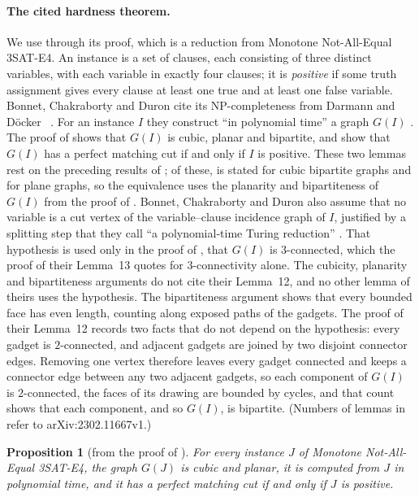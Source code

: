 \documentclass[11pt]{article}
\newtheorem{proposition}[theorem]{Proposition}
\theoremstyle{remark}
\begin{document}
\paragraph{The cited hardness theorem.} We use \cite[Theorem~1]{BCD}
through its proof, which is a reduction from Monotone Not-All-Equal 3SAT-E4.
An instance is a set of clauses, each consisting of three distinct variables,
with each variable in exactly four clauses; it is \emph{positive} if some
truth assignment gives every clause at least one true and at least one false
variable. Bonnet, Chakraborty and Duron cite its NP-completeness from Darmann
and Döcker~\cite{DD} \cite[Section~3.2]{BCD}. For an instance $I$ they
construct ``in polynomial time'' a graph $G(I)$ \cite[Section~3.2]{BCD}. The
proof of \cite[Lemma~13]{BCD} shows that $G(I)$ is cubic, planar and
bipartite, and \cite[Lemmas~26 and~28]{BCD} show that $G(I)$ has a perfect
matching cut if and only if $I$ is positive. These two lemmas rest on the
preceding results of \cite[Section~3]{BCD}; of these, \cite[Lemma~7]{BCD} is
stated for cubic bipartite graphs and \cite[Lemma~3]{BCD} for plane graphs, so
the equivalence uses the planarity and bipartiteness of $G(I)$ from the proof
of \cite[Lemma~13]{BCD}.
Bonnet, Chakraborty and Duron also assume that no variable is a cut vertex of
the variable--clause incidence graph of $I$, justified by a splitting step
that they call ``a polynomial-time Turing reduction'' \cite[Section~3.2]{BCD}.
That hypothesis is used only in the proof of \cite[Lemma~12]{BCD}, that
$G(I)$ is $3$-connected, which the proof of their Lemma~13 quotes for
$3$-connectivity alone. The cubicity, planarity and bipartiteness arguments do
not cite their Lemma~12, and no other lemma of theirs uses the hypothesis. The bipartiteness argument shows that
every bounded face has even length, counting along exposed paths of the
gadgets. The proof of their Lemma~12 records two facts that do not depend on the
hypothesis: every gadget is $2$-connected, and adjacent gadgets are joined by
two disjoint connector edges. Removing one vertex therefore leaves every gadget
connected and keeps a connector edge between any two adjacent gadgets, so each
component of $G(I)$ is $2$-connected, the faces of its drawing are bounded by
cycles, and that count shows that each component, and so $G(I)$, is bipartite.
(Numbers of lemmas in \cite{BCD} refer to arXiv:2302.11667v1.)

\begin{proposition}[from the proof of {\cite[Theorem~1]{BCD}}]\label{prop:bcd}
For every instance $J$ of Monotone Not-All-Equal 3SAT-E4, the graph $G(J)$ is
cubic and planar, it is computed from $J$ in polynomial time, and it has a
perfect matching cut if and only if $J$ is positive.
\end{proposition}
\end{document}
